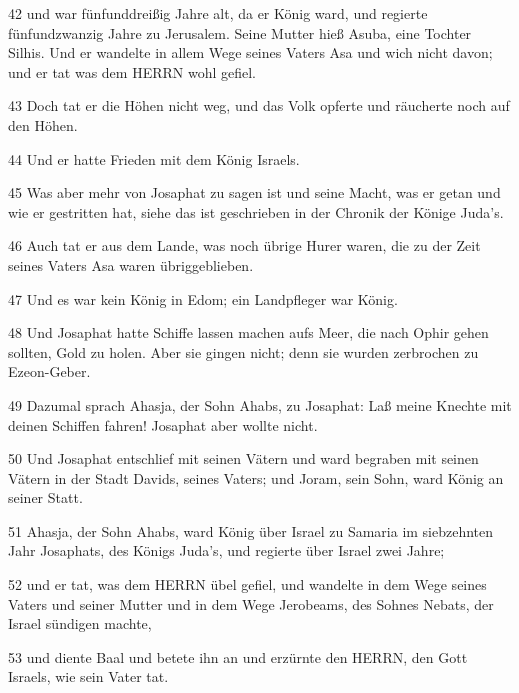 \par 42 und war fünfunddreißig Jahre alt, da er König ward, und regierte fünfundzwanzig Jahre zu Jerusalem. Seine Mutter hieß Asuba, eine Tochter Silhis. Und er wandelte in allem Wege seines Vaters Asa und wich nicht davon; und er tat was dem HERRN wohl gefiel.
\par 43 Doch tat er die Höhen nicht weg, und das Volk opferte und räucherte noch auf den Höhen.
\par 44 Und er hatte Frieden mit dem König Israels.
\par 45 Was aber mehr von Josaphat zu sagen ist und seine Macht, was er getan und wie er gestritten hat, siehe das ist geschrieben in der Chronik der Könige Juda's.
\par 46 Auch tat er aus dem Lande, was noch übrige Hurer waren, die zu der Zeit seines Vaters Asa waren übriggeblieben.
\par 47 Und es war kein König in Edom; ein Landpfleger war König.
\par 48 Und Josaphat hatte Schiffe lassen machen aufs Meer, die nach Ophir gehen sollten, Gold zu holen. Aber sie gingen nicht; denn sie wurden zerbrochen zu Ezeon-Geber.
\par 49 Dazumal sprach Ahasja, der Sohn Ahabs, zu Josaphat: Laß meine Knechte mit deinen Schiffen fahren! Josaphat aber wollte nicht.
\par 50 Und Josaphat entschlief mit seinen Vätern und ward begraben mit seinen Vätern in der Stadt Davids, seines Vaters; und Joram, sein Sohn, ward König an seiner Statt.
\par 51 Ahasja, der Sohn Ahabs, ward König über Israel zu Samaria im siebzehnten Jahr Josaphats, des Königs Juda's, und regierte über Israel zwei Jahre;
\par 52 und er tat, was dem HERRN übel gefiel, und wandelte in dem Wege seines Vaters und seiner Mutter und in dem Wege Jerobeams, des Sohnes Nebats, der Israel sündigen machte,
\par 53 und diente Baal und betete ihn an und erzürnte den HERRN, den Gott Israels, wie sein Vater tat.


